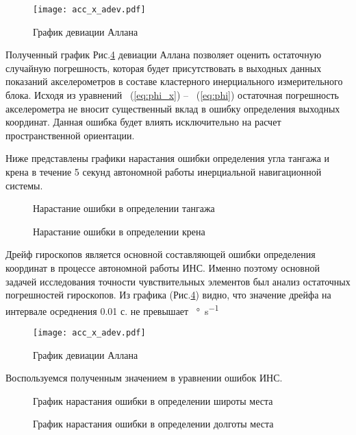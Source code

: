 \newpage

\begin{figure}[h!]
	\centering
	\texttt{[image: acc\_x\_adev.pdf]}
	\caption{График девиации Аллана}
	\label{fig:mpr}
\end{figure}


Полученный график Рис.\ref{fig:mpr} девиации Аллана позволяет оценить остаточную случайную погрешность, которая будет присутствовать в выходных данных показаний акселерометров в составе кластерного инерциального измерительного блока. Исходя из уравнений ~(\ref{eq:phi_x}) -- ~(\ref{eq:phi}) остаточная погрешность акселерометра не вносит существенный вклад в ошибку определения выходных координат. Данная ошибка будет влиять исключительно на расчет пространственной ориентации.  


Ниже представлены графики нарастания ошибки определения угла тангажа и крена в течение 5 секунд автономной работы инерциальной навигационной системы. 


\begin{figure}[h]
	\caption{Нарастание ошибки в определении тангажа}
	\label{fig:pitch}
\end{figure}


\begin{figure}[h]
	\caption{Нарастание ошибки в определении крена}
	\label{fig:roll}
\end{figure}

 
Дрейф гироскопов является основной составляющей ошибки определения координат в процессе автономной работы ИНС. Именно поэтому основной задачей исследования точности чувствительных элементов был анализ остаточных погрешностей гироскопов. Из графика (Рис.\ref{fig:mpr}) видно, что значение дрейфа на интервале осреднения 0.01 с. не превышает \SI[per-mode=symbol]{}{\degree\per\second}

\newpage

\begin{figure}[h!]
	\centering
	\texttt{[image: acc\_x\_adev.pdf]}
	\caption{График девиации Аллана}
	\label{fig:mpr}
\end{figure}


Воспользуемся полученным значением в уравнении ошибок ИНС.

\begin{figure}[h!]
	\caption{График нарастания ошибки в определении широты места}
	\label{fig:lat_error}
\end{figure}


\begin{figure}[h!]
	\caption{График нарастания ошибки в определении долготы места}
	\label{fig:long_error}
\end{figure}

\newpage